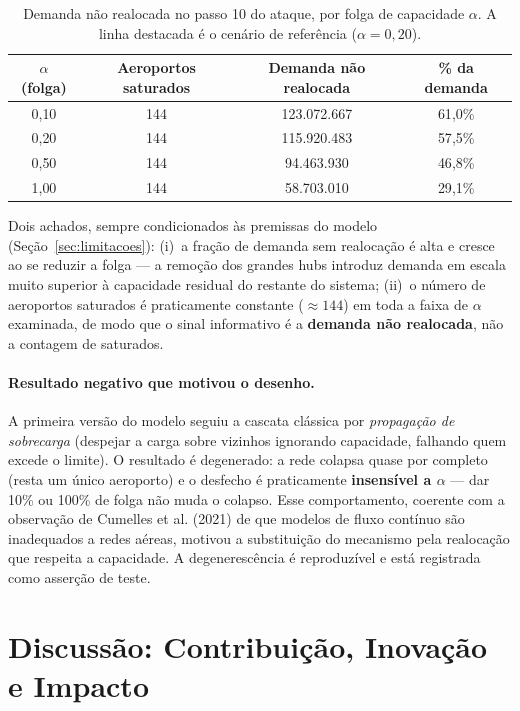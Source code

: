 \documentclass[12pt,a4paper]{article}
\begin{document}
\begin{table}[h!]
\centering
\renewcommand{\arraystretch}{1.3}
\small
\begin{tabular}{cccc}
\toprule
\textbf{$\alpha$ (folga)} & \textbf{Aeroportos saturados} & \textbf{Demanda não realocada} & \textbf{\% da demanda} \\
\midrule
0{,}10 & 144 & 123.072.667 & 61{,}0\% \\
\rowcolor{azulclaro}
0{,}20 & 144 & 115.920.483 & 57{,}5\% \\
0{,}50 & 144 &  94.463.930 & 46{,}8\% \\
1{,}00 & 144 &  58.703.010 & 29{,}1\% \\
\bottomrule
\end{tabular}
\caption{Demanda não realocada no passo 10 do ataque, por folga de capacidade $\alpha$. A linha
destacada é o cenário de referência ($\alpha = 0{,}20$).}
\label{tab:cascata}
\end{table}

Dois achados, sempre condicionados às premissas do modelo (Seção~\ref{sec:limitacoes}):
(i)~a fração de demanda sem realocação é alta e cresce ao se reduzir a folga --- a remoção dos
grandes hubs introduz demanda em escala muito superior à capacidade residual do restante do
sistema; (ii)~o número de aeroportos saturados é praticamente constante ($\approx 144$) em toda
a faixa de $\alpha$ examinada, de modo que o sinal informativo é a \textbf{demanda não realocada},
não a contagem de saturados.

\paragraph{Resultado negativo que motivou o desenho.} A primeira versão do modelo seguiu a cascata
clássica por \textit{propagação de sobrecarga} (despejar a carga sobre vizinhos ignorando
capacidade, falhando quem excede o limite). O resultado é degenerado: a rede colapsa quase por
completo (resta um único aeroporto) e o desfecho é praticamente \textbf{insensível a $\alpha$} ---
dar 10\% ou 100\% de folga não muda o colapso. Esse comportamento, coerente com a observação de
Cumelles et al. (2021) de que modelos de fluxo contínuo são inadequados a redes aéreas, motivou a
substituição do mecanismo pela realocação que respeita a capacidade. A degenerescência é
reproduzível e está registrada como asserção de teste.

\section{Discussão: Contribuição, Inovação e Impacto}
\label{sec:discussao}
\end{document}
